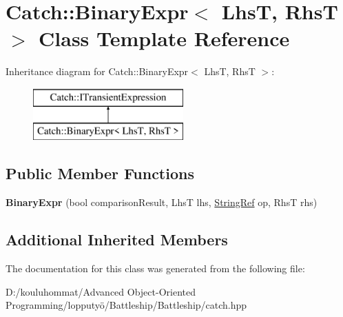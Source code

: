 \hypertarget{class_catch_1_1_binary_expr}{}\section{Catch\+:\+:Binary\+Expr$<$ LhsT, RhsT $>$ Class Template Reference}
\label{class_catch_1_1_binary_expr}
Inheritance diagram for Catch\+:\+:Binary\+Expr$<$ LhsT, RhsT $>$\+:\begin{figure}[H]
\begin{center}
\leavevmode
\includegraphics[height=2.000000cm]{class_catch_1_1_binary_expr}
\end{center}
\end{figure}
\subsection*{Public Member Functions}
\begin{DoxyCompactItemize}
\item 
\mbox{\label{class_catch_1_1_binary_expr_a657d66346aef97a760c22776fe6008b6}} 
{\bfseries Binary\+Expr} (bool comparison\+Result, LhsT lhs, \mbox{\hyperlink{class_catch_1_1_string_ref}{String\+Ref}} op, RhsT rhs)
\end{DoxyCompactItemize}
\subsection*{Additional Inherited Members}


The documentation for this class was generated from the following file\+:\begin{DoxyCompactItemize}
\item 
D\+:/kouluhommat/\+Advanced Object-\/\+Oriented Programming/lopputyö/\+Battleship/\+Battleship/catch.\+hpp\end{DoxyCompactItemize}
